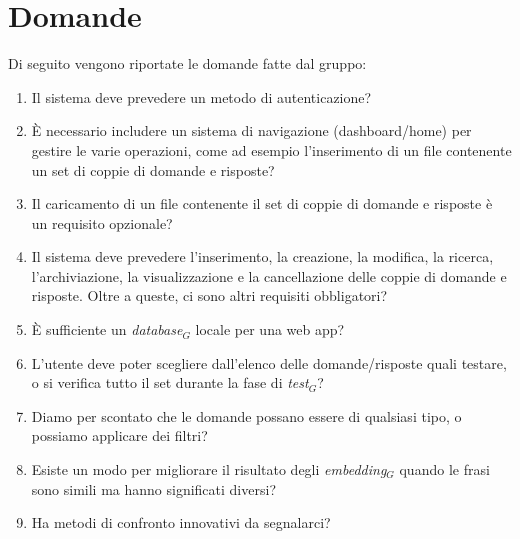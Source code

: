 \documentclass[a4paper, 12pt]{article}
\begin{document}
\newpage

\section{Domande}
\label{sec:Domande}
Di seguito vengono riportate le domande fatte dal gruppo:
\begin{enumerate}
    \item Il sistema deve prevedere un metodo di autenticazione?
    \item È necessario includere un sistema di navigazione (dashboard/home) per gestire le varie operazioni, come ad esempio l'inserimento di un file contenente un set di coppie di domande e risposte?
    \item Il caricamento di un file contenente il set di coppie di domande e risposte è un requisito opzionale?
    \item Il sistema deve prevedere l'inserimento, la creazione, la modifica, la ricerca, l'archiviazione, la visualizzazione e la cancellazione delle coppie di domande e risposte. Oltre a queste, ci sono altri requisiti obbligatori?
    \item È sufficiente un \textit{database$_{G}$} locale per una web app?
    \item L'utente deve poter scegliere dall'elenco delle domande/risposte quali testare, o si verifica tutto il set durante la fase di \textit{test$_{G}$}?
    \item Diamo per scontato che le domande possano essere di qualsiasi tipo, o possiamo applicare dei filtri?
    \item Esiste un modo per migliorare il risultato degli \textit{embedding$_{G}$} quando le frasi sono simili ma hanno significati diversi?
    \item Ha metodi di confronto innovativi da segnalarci?
\end{enumerate}
\end{document}
